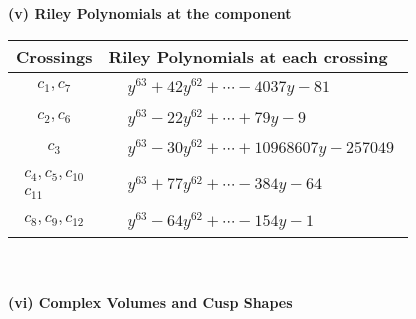 \documentclass[1p]{elsarticle_modified}
\theoremstyle{definition}
\begin{document}
\newpage\renewcommand{\arraystretch}{1}
\flushleft \textbf{(v) Riley Polynomials at the component}\newline \\
\begin{tabular}{m{50pt}|m{274pt}}
Crossings & \hspace{64pt}Riley Polynomials at each crossing \\
\hline $$\begin{aligned}c_{1},c_{7}\end{aligned}$$&$\begin{aligned}
&y^{63}+42 y^{62}+\cdots-4037 y-81
\end{aligned}$\\
\hline $$\begin{aligned}c_{2},c_{6}\end{aligned}$$&$\begin{aligned}
&y^{63}-22 y^{62}+\cdots+79 y-9
\end{aligned}$\\
\hline $$\begin{aligned}c_{3}\end{aligned}$$&$\begin{aligned}
&y^{63}-30 y^{62}+\cdots+10968607 y-257049
\end{aligned}$\\
\hline $$\begin{aligned}c_{4},c_{5},c_{10}\\c_{11}\end{aligned}$$&$\begin{aligned}
&y^{63}+77 y^{62}+\cdots-384 y-64
\end{aligned}$\\
\hline $$\begin{aligned}c_{8},c_{9},c_{12}\end{aligned}$$&$\begin{aligned}
&y^{63}-64 y^{62}+\cdots-154 y-1
\end{aligned}$\\
\hline
\end{tabular}\\~\\
\newpage\flushleft \textbf{(vi) Complex Volumes and Cusp Shapes}
\end{document}
